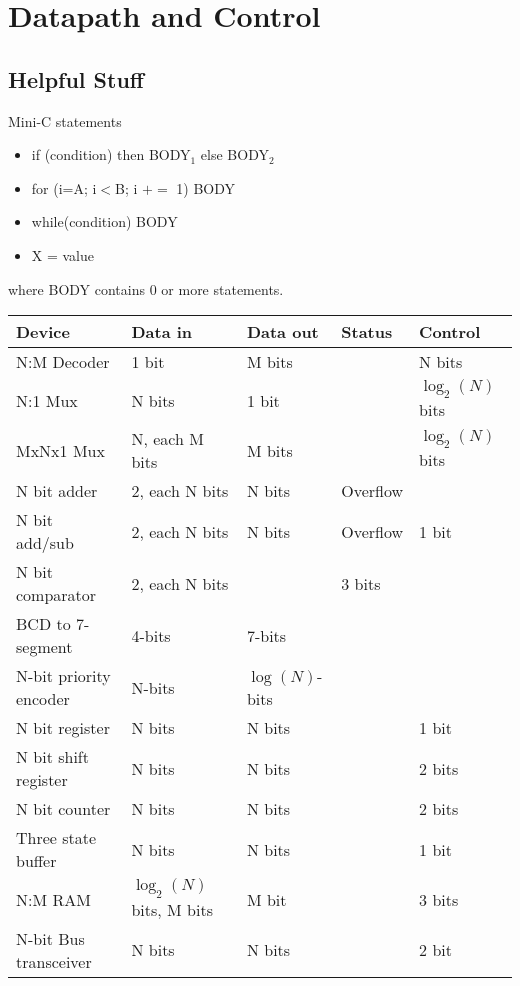 \section{Datapath and Control}
\graphicspath{ {./chapter08/FigWork} }

\subsection{Helpful Stuff}



Mini-C statements
\begin{itemize}
\item if (condition) then BODY$_1$ else BODY$_2$
\item for (i=A; i$<$B; i $+=$ 1) BODY
\item while(condition) BODY
\item X = value
\end{itemize}
where BODY contains 0 or more statements.
\vspace{0.1in}

\begin{tabular}{|l|l|l|l|l|} \hline
Device      & Data in     & Data out & Status   & Control \\ \hline
N:M Decoder &  1 bit       & M bits  & 	& N bits  \\ \hline
N:1 Mux     & N bits  & 1 bit    & 	&  $\log_2(N)$ bits  \\ \hline
MxNx1 Mux   & N, each M bits  & M bits & 	&  $\log_2(N)$ bits  \\ \hline
N bit adder &  2, each N bits & N bits & Overflow &   \\ \hline
N bit add/sub & 2, each N bits & N bits & Overflow & 1 bit  \\ \hline
N bit comparator  & 2, each N bits &  & 3 bits &   \\ \hline
BCD to 7-segment  & 4-bits & 7-bits & &   \\ \hline
N-bit priority encoder   & N-bits & $\log(N)$-bits & &   \\ \hline
N bit register      & N bits & N bits &  & 1 bit  \\ \hline
N bit shift register &  N bits & N bits &  & 2 bits  \\ \hline
N bit counter       & N bits & N bits &  & 2 bits  \\ \hline
Three state buffer    & N bits & N bits & & 1 bit  \\ \hline
N:M RAM             & $\log_2(N)$ bits, M bits & M bit & & 3 bits  \\ \hline
N-bit Bus transceiver     & N bits & N bits & & 2 bit  \\ \hline
\end{tabular}
\label{page:boxlist}


